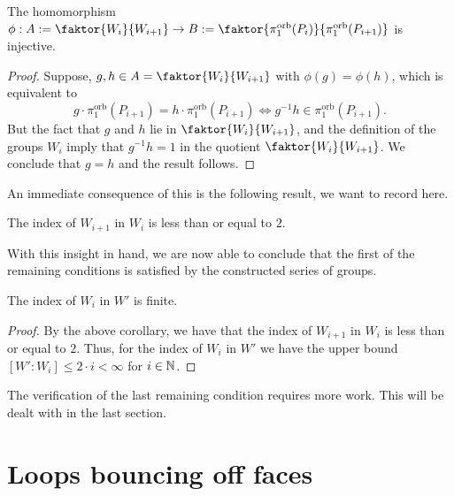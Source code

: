 \begin{lemma}\label{lem:index}
    The homomorphism \(\phi : A := \faktor{W_i}{W_{i+1}} \to B := \faktor{\pi_1^{\text{orb}}(P_i)}{\pi_1^{\text{orb}}(P_{i+1})}\) is injective.
\end{lemma}
\begin{proof}
    Suppose, \(g,h \in A = \faktor{W_i}{W_{i+1}}\) with \(\phi(g) = \phi(h)\), which is equivalent to
    \[g \cdot \pi_1^{\text{orb}}(P_{i+1}) = h \cdot \pi_1^{\text{orb}}(P_{i+1}) \iff g^{-1}h \in \pi_1^{\text{orb}}(P_{i+1}).\]
    But the fact that \(g\) and \(h\) lie in \(\faktor{W_i}{W_{i+1}}\), and the definition of the groups \(W_i\) imply that \(g^{-1}h = 1\) in the quotient \(\faktor{W_i}{W_{i+1}}\).
    We conclude that \(g = h\) and the result follows. 
\end{proof}

An immediate consequence of this is the following result, we want to record here.

\begin{corollary}
    The index of \(W_{i+1}\) in \(W_i\) is less than or equal to \(2\).
\end{corollary}

With this insight in hand, we are now able to conclude that the first of the remaining conditions is satisfied by the constructed series of groups.

\begin{corollary}
    The index of \(W_i\) in \(W'\) is finite.
\end{corollary}
\begin{proof}
    By the above corollary, we have that the index of \(W_{i+1}\) in \(W_i\) is less than or equal to \(2\).
    Thus, for the index of \(W_i\) in \(W'\) we have the upper bound \([W':W_i] \leq 2 \cdot i < \infty\) for \(i \in \mathbb{N}\).
\end{proof}

The verification of the last remaining condition requires more work.
This will be dealt with in the last section.


\section{Loops bouncing off faces}

